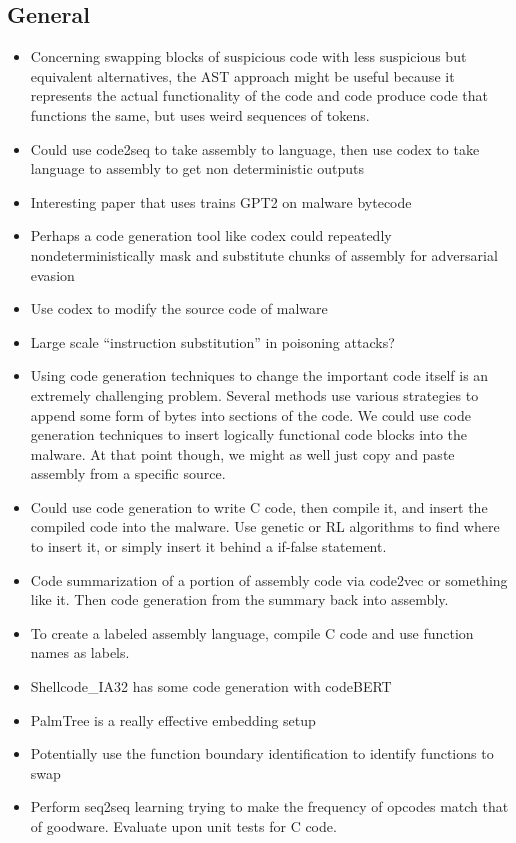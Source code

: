 \documentclass{article}
\begin{document}
\subsection*{General}
\begin{itemize}
	\item Concerning swapping blocks of suspicious code with less suspicious but equivalent alternatives, the AST approach might be useful because it represents the actual functionality of the code and code produce code that functions the same, but uses weird sequences of tokens.
	\item Could use code2seq to take assembly to language, then use codex to take language to assembly to get non deterministic outputs
	\item Interesting paper that uses trains GPT2 on malware bytecode
	\item Perhaps a code generation tool like codex could repeatedly nondeterministically mask and substitute chunks of assembly for adversarial evasion
	\item Use codex to modify the source code of malware
	\item Large scale ``instruction substitution'' in poisoning attacks?
	\item Using code generation techniques to change the important code itself is an extremely challenging problem. Several methods use various strategies to append some form of bytes into sections of the code. We could use code generation techniques to insert logically functional code blocks into the malware. At that point though, we might as well just copy and paste assembly from a specific source. 
	\item Could use code generation to write C code, then compile it, and insert the compiled code into the malware. Use genetic or RL algorithms to find where to insert it, or simply insert it behind a if-false statement.
	\item Code summarization of a portion of assembly code via code2vec or something like it. Then code generation from the summary back into assembly.
	\item To create a labeled assembly language, compile C code and use function names as labels.
	\item Shellcode\_IA32 has some code generation with codeBERT
	\item PalmTree is a really effective embedding setup
	\item Potentially use the function boundary identification to identify functions to swap
	\item Perform seq2seq learning trying to make the frequency of opcodes match that of goodware. Evaluate upon unit tests for C code.
\end{itemize}
\end{document}
